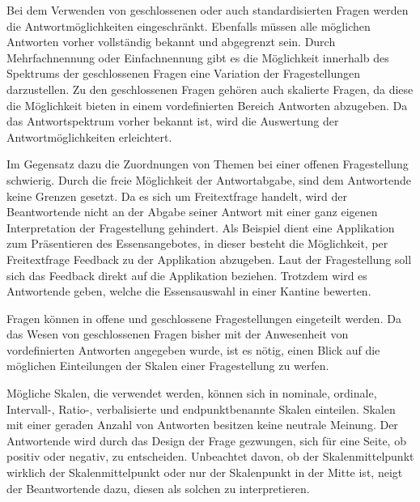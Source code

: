 Bei dem Verwenden von geschlossenen oder auch standardisierten Fragen werden die Antwortmöglichkeiten eingeschränkt.
Ebenfalls müssen alle möglichen Antworten vorher vollständig bekannt und abgegrenzt sein\autocite[S.66]{2014Fragebogen}. %
Durch Mehrfachnennung oder Einfachnennung gibt es die Möglichkeit innerhalb des Spektrums der geschlossenen Fragen eine Variation der Fragestellungen darzustellen\autocite[S.31]{2009Fragebogen}. %
Zu den geschlossenen Fragen gehören auch skalierte Fragen, da diese die Möglichkeit bieten in einem vordefinierten Bereich Antworten abzugeben.
Da das Antwortspektrum vorher bekannt ist, wird die Auswertung der Antwortmöglichkeiten erleichtert.

Im Gegensatz dazu die Zuordnungen von Themen bei einer offenen Fragestellung schwierig.
Durch die freie Möglichkeit der Antwortabgabe, sind dem Antwortende keine Grenzen gesetzt.
Da es sich um Freitextfrage handelt, wird der Beantwortende nicht an der Abgabe seiner Antwort mit einer ganz eigenen Interpretation der Fragestellung gehindert. 
Als Beispiel dient eine Applikation zum Präsentieren des Essensangebotes, in dieser besteht die Möglichkeit, per Freitextfrage Feedback zu der Applikation abzugeben.
Laut der Fragestellung soll sich das Feedback direkt auf die Applikation beziehen.
Trotzdem wird es Antwortende geben, welche die Essensauswahl in einer Kantine bewerten.

Fragen können in offene und geschlossene Fragestellungen eingeteilt werden.
Da das Wesen von geschlossenen Fragen bisher mit der Anwesenheit von vordefinierten Antworten angegeben wurde, ist es nötig, einen Blick auf die möglichen Einteilungen der Skalen einer Fragestellung zu werfen.

Mögliche Skalen, die verwendet werden, können sich in nominale, ordinale,\\
 Intervall-, Ratio-, verbalisierte und endpunktbenannte Skalen einteilen\autocite[S.71]{2014Fragebogen}. %
Skalen mit einer geraden Anzahl von Antworten besitzen keine neutrale Meinung. 
Der Antwortende wird durch das Design der Frage gezwungen, sich für eine Seite, ob positiv oder negativ, zu entscheiden.
Unbeachtet davon, ob der Skalenmittelpunkt wirklich der Skalenmittelpunkt oder nur der Skalenpunkt in der Mitte ist, neigt der Beantwortende dazu, diesen als solchen zu interpretieren\autocite[S.83]{2014Fragebogen}.%


